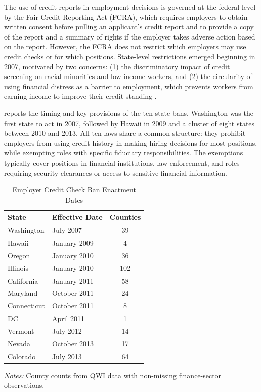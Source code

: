 \documentclass[12pt]{article}
\begin{document}
The use of credit reports in employment decisions is governed at the federal level by the Fair Credit Reporting Act (FCRA), which requires employers to obtain written consent before pulling an applicant's credit report and to provide a copy of the report and a summary of rights if the employer takes adverse action based on the report. However, the FCRA does not restrict which employers may use credit checks or for which positions. State-level restrictions emerged beginning in 2007, motivated by two concerns: (1) the discriminatory impact of credit screening on racial minorities and low-income workers, and (2) the circularity of using financial distress as a barrier to employment, which prevents workers from earning income to improve their credit standing \citep{traub2013discredited,clifford2017employer}.

 reports the timing and key provisions of the ten state bans. Washington was the first state to act in 2007, followed by Hawaii in 2009 and a cluster of eight states between 2010 and 2013. All ten laws share a common structure: they prohibit employers from using credit history in making hiring decisions for most positions, while exempting roles with specific fiduciary responsibilities. The exemptions typically cover positions in financial institutions, law enforcement, and roles requiring security clearances or access to sensitive financial information.

\begin{table}[htbp]
\centering
\caption{Employer Credit Check Ban Enactment Dates}
\label{tab:timing}
\begin{tabular}{llc}
\toprule
State & Effective Date & Counties \\
\midrule
Washington & July 2007 & 39 \\
Hawaii & January 2009 & 4 \\
Oregon & January 2010 & 36 \\
Illinois & January 2010 & 102 \\
California & January 2011 & 58 \\
Maryland & October 2011 & 24 \\
Connecticut & October 2011 & 8 \\
DC & April 2011 & 1 \\
Vermont & July 2012 & 14 \\
Nevada & October 2013 & 17 \\
Colorado & July 2013 & 64 \\
\bottomrule
\end{tabular}
\begin{tablenotes}
\small
\item \textit{Notes:} County counts from QWI data with non-missing finance-sector observations.
\end{tablenotes}
\end{table}
\end{document}
